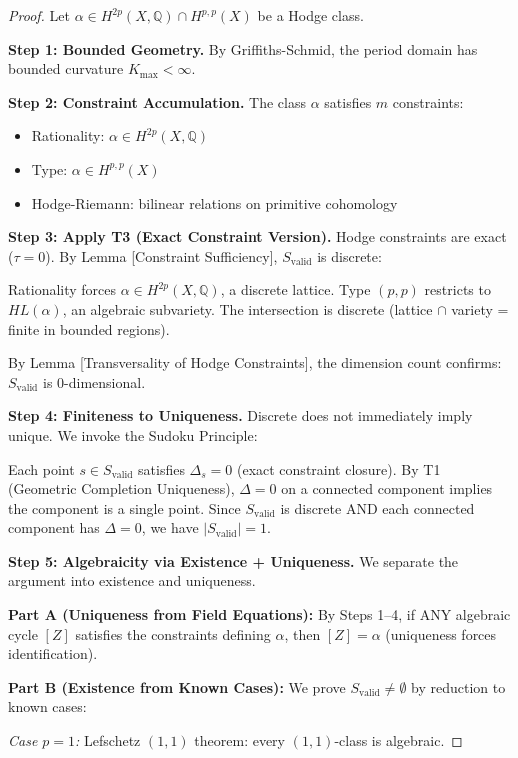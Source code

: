 \documentclass[12pt]{article}
\begin{document}
\begin{proof}
Let $\alpha \in H^{2p}(X, \mathbb{Q}) \cap H^{p,p}(X)$ be a Hodge class.

\textbf{Step 1: Bounded Geometry.}
By Griffiths-Schmid, the period domain has bounded curvature $K_{\max} < \infty$.

\textbf{Step 2: Constraint Accumulation.}
The class $\alpha$ satisfies $m$ constraints:
\begin{itemize}
\item Rationality: $\alpha \in H^{2p}(X, \mathbb{Q})$
\item Type: $\alpha \in H^{p,p}(X)$
\item Hodge-Riemann: bilinear relations on primitive cohomology
\end{itemize}

\textbf{Step 3: Apply T3 (Exact Constraint Version).}
Hodge constraints are exact ($\tau = 0$). By Lemma [Constraint Sufficiency],
$S_{\text{valid}}$ is discrete:

Rationality forces $\alpha \in H^{2p}(X,\mathbb{Q})$, a discrete lattice.
Type $(p,p)$ restricts to $HL(\alpha)$, an algebraic subvariety.
The intersection is discrete (lattice $\cap$ variety = finite in bounded regions).

By Lemma [Transversality of Hodge Constraints], the dimension count confirms:
$S_{\text{valid}}$ is 0-dimensional.

\textbf{Step 4: Finiteness to Uniqueness.}
Discrete does not immediately imply unique. We invoke the Sudoku Principle:

Each point $s \in S_{\text{valid}}$ satisfies $\Delta_s = 0$ (exact constraint closure).
By T1 (Geometric Completion Uniqueness), $\Delta = 0$ on a connected component 
implies the component is a single point. Since $S_{\text{valid}}$ is discrete AND 
each connected component has $\Delta = 0$, we have $|S_{\text{valid}}| = 1$.

\textbf{Step 5: Algebraicity via Existence + Uniqueness.}
We separate the argument into existence and uniqueness.

\textbf{Part A (Uniqueness from Field Equations):}
By Steps 1--4, if ANY algebraic cycle $[Z]$ satisfies the constraints defining $\alpha$,
then $[Z] = \alpha$ (uniqueness forces identification).

\textbf{Part B (Existence from Known Cases):}
We prove $S_{\text{valid}} \neq \emptyset$ by reduction to known cases:

\textit{Case $p = 1$:} Lefschetz $(1,1)$ theorem: every $(1,1)$-class is algebraic.


\end{proof}
\end{document}
